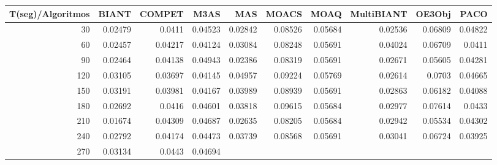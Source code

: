 \begin{table}[h]
    \centering
    \begin{tabular}{|r|r|r|r|r|r|r|r|r|r|}
        \hline \tiny T(seg)/Algoritmos & \tiny {BIANT} & \tiny {COMPET} & \tiny {M3AS} & \tiny
        {MAS} & \tiny {MOACS} & \tiny {MOAQ} & \tiny {MultiBIANT} & \tiny {OE3Obj} & \tiny {PACO} \\
        \hline \tiny 30 &{\tiny 0.02479}    &{\tiny 0.0411}    &{\tiny 0.04523}    &{\tiny 0.02842}
        &{\tiny 0.08526}    &{\tiny 0.05684}    &{\tiny 0.02536}    &{\tiny 0.06809}    &{\tiny 0.04822} \\
        \hline \tiny 60 &{\tiny 0.02457}    &{\tiny 0.04217}    &{\tiny 0.04124}    &{\tiny
        0.03084}    &{\tiny 0.08248}    &{\tiny 0.05691}    &{\tiny 0.04024}    &{\tiny 0.06709}
        &{\tiny 0.0411} \\
        \hline \tiny 90 &{\tiny 0.02464}    &{\tiny 0.04138}    &{\tiny 0.04943}    &{\tiny
        0.02386}    &{\tiny 0.08319}    &{\tiny 0.05691}    &{\tiny 0.02671}    &{\tiny 0.05605}
        &{\tiny 0.04281} \\
        \hline \tiny 120 &{\tiny 0.03105}    &{\tiny 0.03697}    &{\tiny 0.04145}    &{\tiny
        0.04957}    &{\tiny 0.09224}    &{\tiny 0.05769}    &{\tiny 0.02614}    &{\tiny 0.0703}
        &{\tiny 0.04665} \\
        \hline \tiny 150 &{\tiny 0.03191}    &{\tiny 0.03981}    &{\tiny 0.04167}    &{\tiny
        0.03989}    &{\tiny 0.08939}    &{\tiny 0.05691}    &{\tiny 0.02863}    &{\tiny 0.06182}
        &{\tiny 0.04088} \\
        \hline \tiny 180 &{\tiny 0.02692}    &{\tiny 0.0416}    &{\tiny 0.04601}    &{\tiny
        0.03818}    &{\tiny 0.09615}    &{\tiny 0.05684}    &{\tiny 0.02977}    &{\tiny 0.07614}
        &{\tiny 0.0433} \\
        \hline \tiny 210 &{\tiny 0.01674}    &{\tiny 0.04309}    &{\tiny 0.04687}    &{\tiny
        0.02635}    &{\tiny 0.08205}    &{\tiny 0.05684}    &{\tiny 0.02942}    &{\tiny 0.05534}
        &{\tiny 0.04302} \\
        \hline \tiny 240 &{\tiny 0.02792}    &{\tiny 0.04174}    &{\tiny 0.04473}    &{\tiny
        0.03739}    &{\tiny 0.08568}    &{\tiny 0.05691}    &{\tiny 0.03041}    &{\tiny 0.06724}
        &{\tiny 0.03925} \\
        \hline \tiny 270 &{\tiny 0.03134}    &{\tiny 0.0443}    &{\tiny 0.04694}    &{\tiny
}
\end{tabular}
\end{table}
